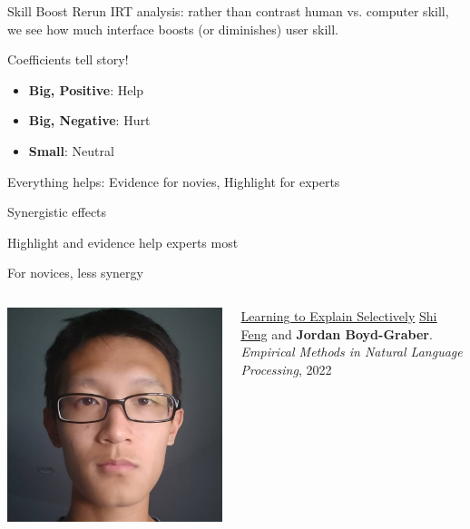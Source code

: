 \documentclass[compress]{beamer}
\newcommand{\fsi}[2]{
\begin{frame}[plain]
\vspace*{-1pt}
\makebox[\linewidth]{\texttt{[image: \#1]}}
\begin{center}
#2
\end{center}
\end{frame}
}
\begin{document}
\begin{frame}{Skill Boost}
  Rerun IRT analysis: rather than contrast human vs. computer skill,
  we see how much interface boosts (or diminishes) user skill.
    \pause

    \begin{block}{Coefficients tell story!}
      \begin{itemize}
        \item {\bf Big, Positive}: Help
        \item {\bf Big, Negative}: Hurt
        \item {\bf Small}: Neutral
      \end{itemize}
    \end{block}

\end{frame}


\fsi{qb/augment/coefs_0}{Everything helps: Evidence for novies,
  Highlight for experts}
\fsi{qb/augment/coefs_1}{Synergistic effects}
\fsi{qb/augment/coefs_2}{Highlight and evidence help experts most}
\fsi{qb/augment/coefs_3}{For novices, less synergy}


\begin{frame}{}

  \begin{columns}
    \begin{center}
        \includegraphics[width=0.8\linewidth]{general_figures/shi}
        \end{center}
    \begin{block}{\href{http://umiacs.umd.edu/~jbg//docs/2023_emnlp_augment.pdf}{Learning to Explain Selectively}}
      \underline{\href{http://users.umiacs.umd.edu/~shifeng/}{Shi Feng}} and {\bf Jordan Boyd-Graber}.  \emph{Empirical Methods in Natural Language Processing}, 2022
        \end{block}

  \end{columns}
\end{frame}
\end{document}
